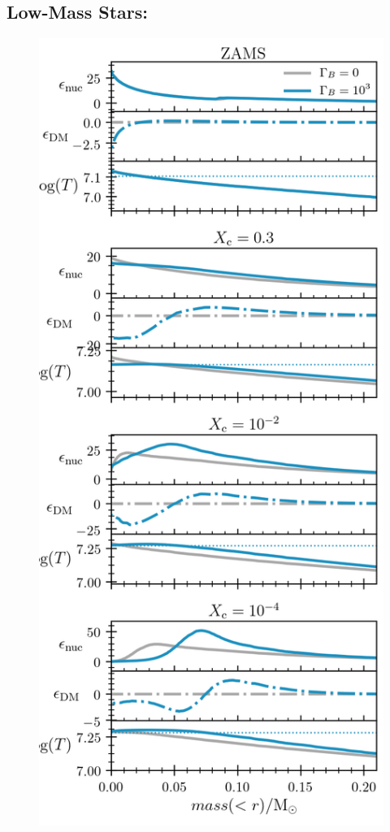 \documentclass[useAMS,usenatbib]{mnras}
\begin{document}
\subsection{Low-Mass Stars: \mrangelow}
\label{sub:lowmass}

  \begin{figure}
    \centering
    \includegraphics[width=\textwidth]{plots/m1p0c3.png}

\end{figure}
\end{document}
